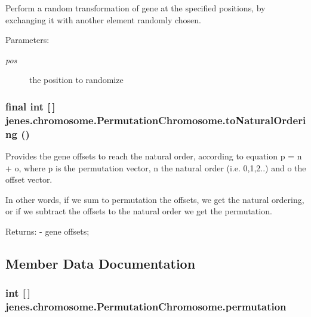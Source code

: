 Perform a random transformation of gene at the specified positions, by exchanging it with another element randomly chosen.

\begin{Desc}
\item[Parameters:]
\begin{description}
\item[{\em pos}]the position to randomize \end{description}
\end{Desc}
\hypertarget{classjenes_1_1chromosome_1_1_permutation_chromosome_0aeb1df52bf751baa4706e5d94dae60d}{
\subsubsection[toNaturalOrdering]{\setlength{\rightskip}{0pt plus 5cm}final int \mbox{[}$\,$\mbox{]} jenes.chromosome.PermutationChromosome.toNaturalOrdering ()}}
\label{classjenes_1_1chromosome_1_1_permutation_chromosome_0aeb1df52bf751baa4706e5d94dae60d}


Provides the gene offsets to reach the natural order, according to equation p = n + o, where p is the permutation vector, n the natural order (i.e. 0,1,2..) and o the offset vector.

In other words, if we sum to permutation the offsets, we get the natural ordering, or if we subtract the offsets to the natural order we get the permutation.

\begin{Desc}
\item[Returns:]- gene offsets; \end{Desc}


\subsection{Member Data Documentation}
\hypertarget{classjenes_1_1chromosome_1_1_permutation_chromosome_8b5701fbbb3cdfef29d346e0375260fc}{
\subsubsection[permutation]{\setlength{\rightskip}{0pt plus 5cm}int \mbox{[}$\,$\mbox{]} {\bf jenes.chromosome.PermutationChromosome.permutation}}}
\label{classjenes_1_1chromosome_1_1_permutation_chromosome_8b5701fbbb3cdfef29d346e0375260fc}


